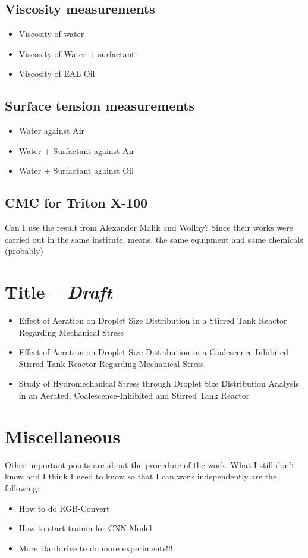 \subsection{Viscosity measurements}
\begin{itemize}
  \item Viscosity of water
  \item Viscosity of Water + surfactant
  \item Viscosity of EAL Oil
\end{itemize}

\subsection{Surface tension measurements}
\begin{itemize}
  \item Water against Air
  \item Water + Surfactant against Air
  \item Water + Surfactant against Oil
\end{itemize}

\subsection{CMC for Triton X-100}
Can I use the result from Alexander Malik and Wollny? Since their works were carried out in the same institute, means, the same equipment and same chemicals (probably)

\section{Title -- \textit{Draft}}
\begin{itemize}
    \item Effect of Aeration on Droplet Size Distribution in a Stirred Tank Reactor Regarding Mechanical Stress
    \item Effect of Aeration on Droplet Size Distribution in a Coalescence-Inhibited Stirred Tank Reactor Regarding Mechanical Stress
    \item Study of Hydromechanical Stress through Droplet Size Distribution Analysis in an Aerated, Coalescence-Inhibited and Stirred Tank Reactor
\end{itemize}


\section{Miscellaneous}
Other important points are about the procedure of the work. What I still don't know and I think I need to know so that I can work independently are the following:

\begin{itemize}
    \item How to do RGB-Convert
    \item How to start trainin for CNN-Model
    \item More Harddrive to do more experiments!!!
\end{itemize}
